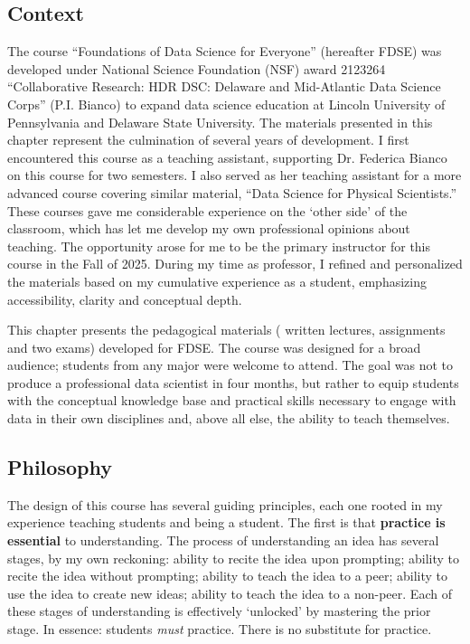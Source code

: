\subsection{Context}
The course ``Foundations of Data Science for Everyone'' (hereafter FDSE) was developed under National Science Foundation (NSF) award 2123264 ``Collaborative Research: HDR DSC: Delaware and Mid-Atlantic Data Science Corps'' (P.I. Bianco) to expand data science education at Lincoln University of Pennsylvania and Delaware State University. The materials presented in this chapter represent the culmination of several years of development. I first encountered this course as a teaching assistant, supporting Dr. Federica Bianco on this course for two semesters. I also served as her teaching assistant for a more advanced course covering similar material, ``Data Science for Physical Scientists.'' These courses gave me considerable experience on the `other side' of the classroom, which has let me develop my own professional opinions about teaching. The opportunity arose for me to be the primary instructor for this course in the Fall of 2025. During my time as professor, I refined and personalized the materials based on my cumulative experience as a student, emphasizing accessibility, clarity and conceptual depth.

This chapter presents the pedagogical materials (\ie{} written lectures, assignments and two exams) developed for FDSE. The course was designed for a broad audience; students from any major were welcome to attend. The goal was not to produce a professional data scientist in four months, but rather to equip students with the conceptual knowledge base and practical skills necessary to engage with data in their own disciplines and, above all else, the ability to teach themselves.

\subsection{Philosophy}
The design of this course has several guiding principles, each one rooted in my experience teaching students and being a student. The first is that \textbf{practice is essential} to understanding. The process of understanding an idea has several stages, by my own reckoning: ability to recite the idea upon prompting; ability to recite the idea without prompting; ability to teach the idea to a peer; ability to use the idea to create new ideas; ability to teach the idea to a non-peer. Each of these stages of understanding is effectively `unlocked' by mastering the prior stage. In essence: students \textit{must} practice. There is no substitute for practice.

